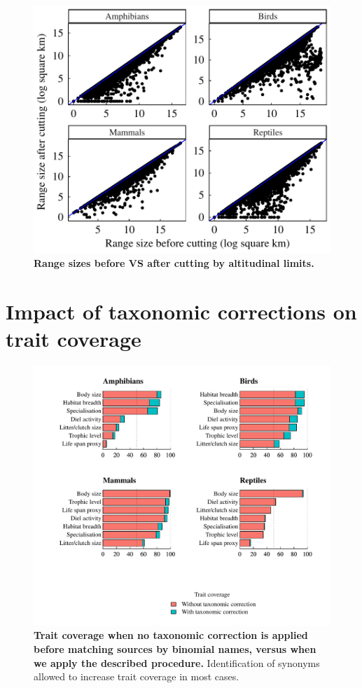 \begin{figure}[h!]
\centering
\includegraphics[scale=0.7]{Supporting/Chapter2/Figures/Rangesizes/RangeSizes_before_aftercuts}
\caption[]{\textbf{Range sizes before VS after cutting by altitudinal limits.}}
\label{}
\end{figure}

\pagebreak

\section{Impact of taxonomic corrections on trait coverage}

\begin{figure}[h!]
\centering
\includegraphics[scale=0.7]{Supporting/Chapter2/Figures/Coverage/DeltaCoverage}
\caption[]{\textbf{Trait coverage when no taxonomic correction is applied before matching sources by binomial names, versus when we apply the described procedure.} Identification of synonyms allowed to increase trait coverage in most cases.}
\label{}
\end{figure}

